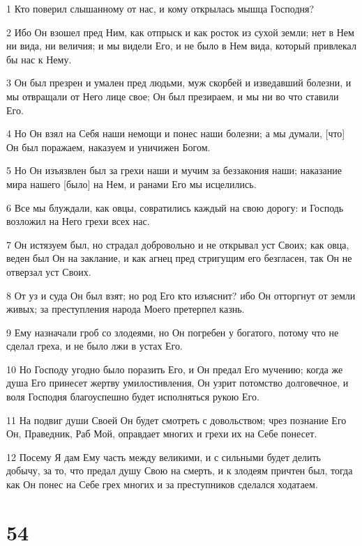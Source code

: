 \par 1 Кто поверил слышанному от нас, и кому открылась мышца Господня?
\par 2 Ибо Он взошел пред Ним, как отпрыск и как росток из сухой земли; нет в Нем ни вида, ни величия; и мы видели Его, и не было в Нем вида, который привлекал бы нас к Нему.
\par 3 Он был презрен и умален пред людьми, муж скорбей и изведавший болезни, и мы отвращали от Него лице свое; Он был презираем, и мы ни во что ставили Его.
\par 4 Но Он взял на Себя наши немощи и понес наши болезни; а мы думали, [что] Он был поражаем, наказуем и уничижен Богом.
\par 5 Но Он изъязвлен был за грехи наши и мучим за беззакония наши; наказание мира нашего [было] на Нем, и ранами Его мы исцелились.
\par 6 Все мы блуждали, как овцы, совратились каждый на свою дорогу: и Господь возложил на Него грехи всех нас.
\par 7 Он истязуем был, но страдал добровольно и не открывал уст Своих; как овца, веден был Он на заклание, и как агнец пред стригущим его безгласен, так Он не отверзал уст Своих.
\par 8 От уз и суда Он был взят; но род Его кто изъяснит? ибо Он отторгнут от земли живых; за преступления народа Моего претерпел казнь.
\par 9 Ему назначали гроб со злодеями, но Он погребен у богатого, потому что не сделал греха, и не было лжи в устах Его.
\par 10 Но Господу угодно было поразить Его, и Он предал Его мучению; когда же душа Его принесет жертву умилостивления, Он узрит потомство долговечное, и воля Господня благоуспешно будет исполняться рукою Его.
\par 11 На подвиг души Своей Он будет смотреть с довольством; чрез познание Его Он, Праведник, Раб Мой, оправдает многих и грехи их на Себе понесет.
\par 12 Посему Я дам Ему часть между великими, и с сильными будет делить добычу, за то, что предал душу Свою на смерть, и к злодеям причтен был, тогда как Он понес на Себе грех многих и за преступников сделался ходатаем.

\chapter{54}


